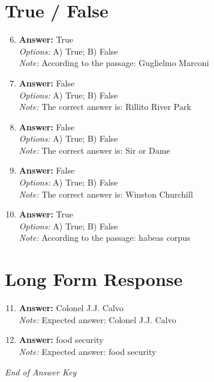 \documentclass[12pt]{article}
\begin{document}
\section*{True / False}
\begin{enumerate}[label=\arabic*.]
\setcounter{enumi}{5}
\item \textbf{Answer:} True
\\ \textit{Options:} A) True; B) False
\\ \textit{Note:} According to the passage: Guglielmo Marconi
\item \textbf{Answer:} False
\\ \textit{Options:} A) True; B) False
\\ \textit{Note:} The correct answer is: Rillito River Park
\item \textbf{Answer:} False
\\ \textit{Options:} A) True; B) False
\\ \textit{Note:} The correct answer is: Sir or Dame
\item \textbf{Answer:} False
\\ \textit{Options:} A) True; B) False
\\ \textit{Note:} The correct answer is: Winston Churchill
\item \textbf{Answer:} True
\\ \textit{Options:} A) True; B) False
\\ \textit{Note:} According to the passage: habeas corpus
\end{enumerate}

\section*{Long Form Response}
\begin{enumerate}[label=\arabic*.]
\setcounter{enumi}{10}
\item \textbf{Answer:} Colonel J.J. Calvo
\\ \textit{Note:} Expected answer: Colonel J.J. Calvo
\item \textbf{Answer:} food security
\\ \textit{Note:} Expected answer: food security
\end{enumerate}

\vfill
\noindent\textit{End of Answer Key}
\end{document}
